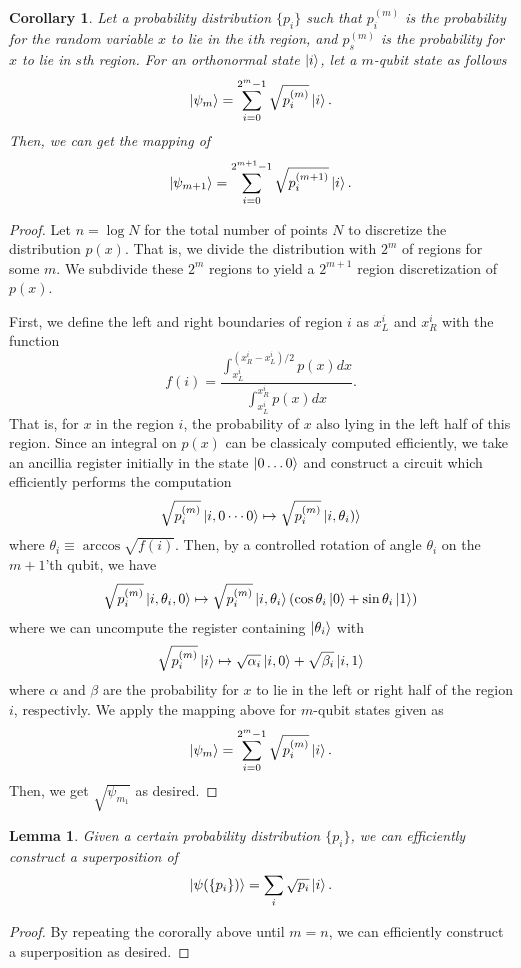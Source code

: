 \documentclass[10pt,twoside,reqno]{amsart} %
\theoremstyle{plain}
\newtheorem{lem}[thm]{Lemma}
\newtheorem{cor}[thm]{Corollary}
\theoremstyle{definition}
\begin{document}
\begin{cor}
  Let a probability distribution $\{p_i\}$ such that $p_i^{(m)}$ is the
  probability for the random variable $x$ to lie in the $i$th region, and 
  $p_s^{(m)}$ is the probability for $x$ to lie in $s$th region. For an
  orthonormal state $\ket{i}$, let a $m$-qubit state as follows
  \[
    \ket{\psi_m} = \sum_{i=0}^{2^m-1}\sqrt{p_i^{(m)}}\ket{i}.
  \]
  Then, we can get the mapping of
  \[
    \ket{\psi_{m+1}}=\sum_{i=0}^{2^{m+1}-1}\sqrt{p_i^{(m+1)}}\ket{i}.
  \]
\end{cor}
\begin{proof}
  Let $n=\log N$ for the total number of points $N$ to discretize the
  distribution $p(x)$. That is, we divide the distribution with $2^m$ of regions
  for some $m$. We subdivide these $2^m$ regions to yield a $2^{m+1}$
  region discretization of $p(x)$. 
  
  First, we define the left and right boundaries of region $i$ as
  $x_L^i$ and $x_R^i$  with the function
  \[
    f(i)=\frac{\int_{x_L^i}^{(x_R^i-x_L^i)/2}p(x)dx}{\int_{x_L^i}^{x_R^i}p(x)dx}.
  \]
  That is, for $x$ in the region $i$, the probability of $x$ also lying
  in the left half of this region. Since an integral on $p(x)$ can be
  classicaly computed efficiently, we take an ancillia register initially
  in the state $\ket{0\ldots 0}$ and construct a circuit which efficiently
  performs the computation
  \[
    \sqrt{p_i^{(m)}}\ket{i,0\cdots0}\mapsto\sqrt{p_i^{(m)}}\ket{i,\theta_i)}
  \]
  where $\theta_i\equiv \arccos\sqrt{f(i)}$. Then, by a controlled rotation
  of angle $\theta_i$ on the $m+1$'th qubit, we have
  \[
    \sqrt{p_i^{(m)}}\ket{i,\theta_i,0}\mapsto
    \sqrt{p_i^{(m)}}\ket{i,\theta_i}(\cos\theta_i\ket0+\sin\theta_i\ket1)
  \]
  where we can uncompute the register containing $\ket{\theta_i}$ with
  \[
    \sqrt{p_i^{(m)}}\ket{i}\mapsto\sqrt{\alpha_i}\ket{i,0}+
    \sqrt{\beta_i}\ket{i,1}
  \]
  where $\alpha$ and $\beta$ are the probability for $x$ to lie in the left
  or right half of the region $i$, respectivly. 
  We apply the mapping above for $m$-qubit states given as
  \[
    \ket{\psi_m} = \sum_{i=0}^{2^m-1}\sqrt{p_i^{(m)}}\ket{i}.
  \]
  Then, we get $\sqrt{\psi_{m_1}}$ as desired.
\end{proof}
\begin{lem}
  Given a certain probability distribution $\{p_i\}$, we can efficiently
  construct a superposition of
  \[
    \ket{\psi(\{p_i\})} = \sum_i\sqrt{p_i}\ket{i}.
  \]
\end{lem}
\begin{proof}
  By repeating the cororally above until $m=n$, we can efficiently construct
  a superposition as desired.
\end{proof}
\end{document}
